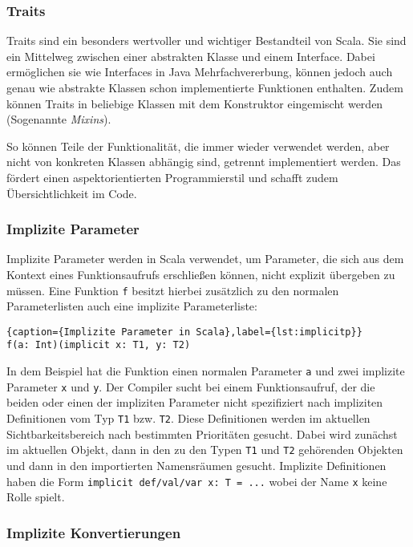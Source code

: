 \subsubsection{Traits}

Traits sind ein besonders wertvoller und wichtiger Bestandteil von Scala. Sie sind ein Mittelweg
zwischen einer abstrakten Klasse und einem Interface. Dabei ermöglichen sie wie Interfaces in Java
Mehrfachvererbung, können jedoch auch genau wie abstrakte Klassen schon implementierte Funktionen
enthalten. Zudem können Traits in beliebige Klassen mit dem Konstruktor eingemischt werden
(Sogenannte \textit{Mixins}).

So können Teile der Funktionalität, die immer wieder verwendet werden, aber nicht von konkreten
Klassen abhängig sind, getrennt implementiert werden. Das fördert einen aspektorientierten
Programmierstil und schafft zudem Übersichtlichkeit im Code.

\subsubsection{Implizite Parameter}

Implizite Parameter werden in Scala verwendet, um Parameter, die sich aus dem  Kontext eines
Funktionsaufrufs erschließen können, nicht explizit übergeben zu müssen. Eine Funktion \texttt{f}
besitzt hierbei zusätzlich zu den normalen  Parameterlisten auch eine implizite Parameterliste:

\begin{lstlisting}{caption={Implizite Parameter in Scala},label={lst:implicitp}}
f(a: Int)(implicit x: T1, y: T2)
\end{lstlisting}

In dem Beispiel hat die Funktion einen normalen Parameter \texttt{a} und zwei  implizite Parameter
\texttt{x} und \texttt{y}. Der Compiler sucht bei einem  Funktionsaufruf, der die beiden oder
einen der impliziten Parameter nicht  spezifiziert nach impliziten Definitionen vom Typ \texttt{T1}
bzw. \texttt{T2}.  Diese Definitionen werden im aktuellen Sichtbarkeitsbereich nach bestimmten
Prioritäten gesucht. Dabei wird zunächst im aktuellen Objekt, dann in den zu den Typen \texttt{T1} und
\texttt{T2} gehörenden Objekten und dann in den  importierten Namensräumen gesucht. Implizite
Definitionen haben die Form \texttt{implicit def/val/var x: T = ...} wobei der Name \texttt{x}
keine Rolle  spielt.

\subsubsection{Implizite Konvertierungen}

